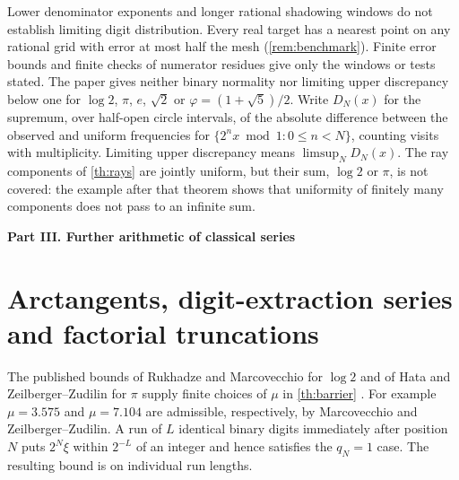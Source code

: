 \documentclass[11pt]{article}
\newcommand{\partmark}[1]{\bigskip\par\begin{center}{\large\bfseries #1}\end{center}\nopagebreak\smallskip}
\begin{document}
\begin{remark}\label{rem:digits}
Lower denominator exponents and longer rational shadowing windows do not establish limiting digit distribution. Every real target has a nearest point on any rational grid with error at most half the mesh (\cref{rem:benchmark}). Finite error bounds and finite checks of numerator residues give only the windows or tests stated. The paper gives neither binary normality nor limiting upper discrepancy below one for $\log 2$, $\pi$, $e$, $\sqrt2$ or $\varphi=(1+\sqrt5)/2$. Write $D_N(x)$ for the supremum, over half-open circle intervals, of the absolute difference between the observed and uniform frequencies for $\{2^n x\bmod 1:0\le n<N\}$, counting visits with multiplicity. Limiting upper discrepancy means $\limsup_N D_N(x)$. The ray components of \cref{th:rays} are jointly uniform, but their sum, $\log 2$ or $\pi$, is not covered: the example after that theorem shows that uniformity of finitely many components does not pass to an infinite sum.
\end{remark}

\partmark{Part III. Further arithmetic of classical series}

\section{Arctangents, digit-extraction series and factorial truncations}\label{sec:classical}

The published bounds of Rukhadze and Marcovecchio for $\log 2$ and of Hata and Zeilberger--Zudilin for $\pi$ supply finite choices of $\mu$ in \cref{th:barrier} \cite{ruk,marc,hata,zz}. For example $\mu=3.575$ and $\mu=7.104$ are admissible, respectively, by Marcovecchio and Zeilberger--Zudilin. A run of $L$ identical binary digits immediately after position $N$ puts $2^N\xi$ within $2^{-L}$ of an integer and hence satisfies the $q_N=1$ case. The resulting bound is on individual run lengths.
\end{document}
